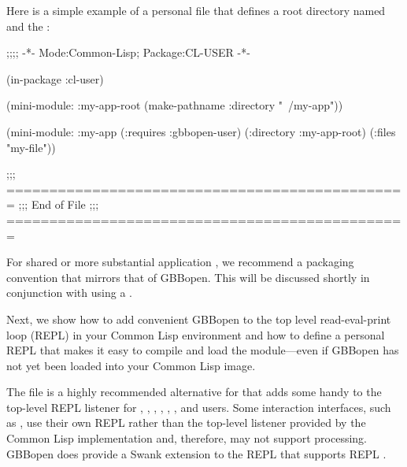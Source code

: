 \documentclass[10pt,twoside,english,pdftex]{article}
\begin{document}
Here is a simple example of a personal
 file that defines a root directory
named  and the  :
%
\W\supp
\begin{example}
  ;;;; -*- Mode:Common-Lisp; Package:CL-USER -*-

  (in-package :cl-user)

  (mini-module: :my-app-root 
      (make-pathname :directory "~/my-app"))    

  (mini-module: :my-app
    (:requires :gbbopen-user)
    (:directory :my-app-root)
    (:files "my-file"))

  ;;; ===============================================
  ;;;   End of File
  ;;; ===============================================
\end{example}

For shared or more substantial application , we recommend a
packaging convention that mirrors that of GBBopen.  This will be discussed
shortly in conjunction with using a .

Next, we show how to add convenient GBBopen  to the
top level read-eval-print loop (REPL) in your Common Lisp environment and how
to define a personal REPL  that makes it easy to compile and
load the  module---even if GBBopen has not yet been loaded into
your Common Lisp image.

%
%
%
The file  is a highly
recommended alternative for 
that adds some handy  to the top-level REPL listener
for
%
,
,
,
,
,
,
 and
%
users.  Some interaction interfaces, such as
, use their own REPL
rather than the top-level listener provided by the Common Lisp implementation
and, therefore, may not support  
processing.  GBBopen does provide a Swank extension to the
 REPL that supports
REPL .
\end{document}
